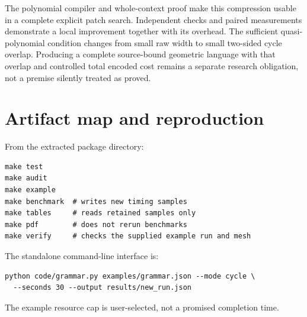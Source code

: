 \documentclass[11pt,a4paper]{article}
\theoremstyle{definition}
\theoremstyle{remark}
\begin{document}
The polynomial compiler and whole-context proof make this compression usable in a complete
explicit patch search. Independent checks and paired measurements demonstrate a local
improvement together with its overhead. The sufficient quasi-polynomial condition changes
from small raw width to small two-sided cycle overlap. Producing a complete source-bound
geometric language with that overlap and controlled total encoded cost remains a separate
research obligation, not a premise silently treated as proved.

\clearpage
\appendix
\section{Artifact map and reproduction}
From the extracted package directory:
\begin{lstlisting}
make test
make audit
make example
make benchmark  # writes new timing samples
make tables     # reads retained samples only
make pdf        # does not rerun benchmarks
make verify     # checks the supplied example run and mesh
\end{lstlisting}
The standalone command-line interface is:
\begin{lstlisting}
python code/grammar.py examples/grammar.json --mode cycle \
  --seconds 30 --output results/new_run.json
\end{lstlisting}
The example resource cap is user-selected, not a promised completion time.
\end{document}
